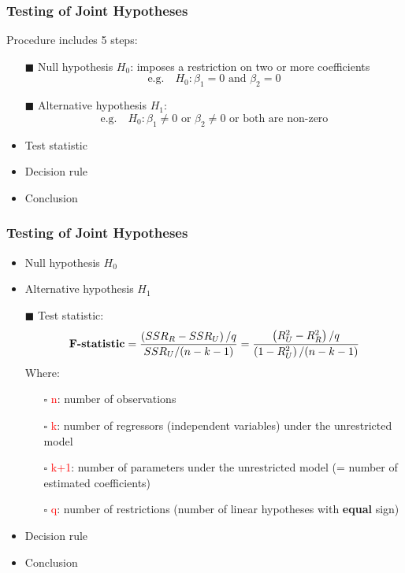 \documentclass[11pt, xcolor=x11names,compress]{beamer}
\begin{document}
\begin{frame}[fragile,t]
\linespread{1.15}
\frametitle{Testing of Joint Hypotheses}


Procedure includes 5 steps:
\begin{itemize}
    \item [$\blacksquare$] Null hypothesis $H_0$: imposes a restriction on two or more coefficients\\
    $$
    \text{e.g.} \quad H_0: \beta_1 = 0 \text{ and } \beta_2 = 0
    $$
    \item [$\blacksquare$] Alternative hypothesis $H_1$:
    $$
    \text{e.g.} \quad H_0: \beta_1 \neq 0 \text{ or } \beta_2 \neq 0 \text{ or both are non-zero}
    $$ 
    \item Test statistic
    \item Decision rule
    \item Conclusion
\end{itemize}

\end{frame}
\begin{frame}[fragile,t]
\linespread{1.15}
\frametitle{Testing of Joint Hypotheses}
\begin{itemize}
    \item Null hypothesis $H_0$
    \item Alternative hypothesis $H_1$
    \item [$\blacksquare$] Test statistic:
    $$
    \textbf{\text{F-statistic}} =\frac{\left(S S R_{R}-S S R_{U}\right) / q}{S S R_{U} /(n-k-1)}  =\frac{\left(R_{U}^{2}-R_{R}^{2}\right) / q}{\left(1-R_{U}^{2}\right) /(n-k-1)}
    $$
    Where: 
    \begin{itemize}
        \item [$\square$] \textcolor{red}{n}: number of observations
        \item [$\square$] \textcolor{red}{k}: number of regressors (independent variables) under the unrestricted model
        \item [$\square$] \textcolor{red}{k+1}: number of parameters under the unrestricted model (= number of estimated coefficients)
        \item [$\square$] \textcolor{red}{q}: number of restrictions (number of linear hypotheses with \textbf{equal} sign)
    \end{itemize}
    \item Decision rule
    \item Conclusion
\end{itemize}

\end{frame}
\end{document}
